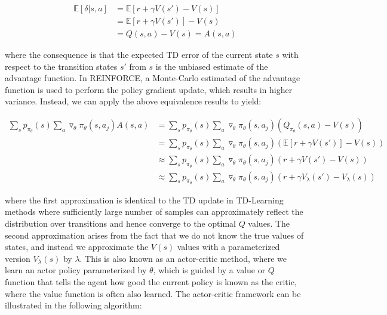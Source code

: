 \documentclass[11pt]{article}
\begin{document}
$$
\begin{aligned}
\mathbb{E}[\delta|s, a] &= \mathbb{E}[r + \gamma V(s') - V(s)]\\
&= \mathbb{E}[r + \gamma V(s')] - V(s)\\
&= Q(s, a) - V(s) = A(s, a)
\end{aligned}
$$

where the consequence is that the expected TD error of the current state $s$ with respect to the transition states $s'$ from $s$ is the unbiased estimate of the advantage function. In REINFORCE, a Monte-Carlo estimated of the advantage function is used to perform the policy gradient update, which results in higher variance. Instead, we can apply the above equivalence results to yield:

$$
\begin{aligned}
\sum_s p_{\pi_{\theta}}(s) \sum_a \triangledown_{\theta} \pi_{\theta}(s, a_j)A(s, a) &= \sum_s p_{\pi_{\theta}}(s) \sum_a \triangledown_{\theta} \pi_{\theta}(s, a_j)(Q_{\pi_{\theta}}(s, a) - V(s))\\
&= \sum_s p_{\pi_{\theta}}(s) \sum_a \triangledown_{\theta} \pi_{\theta}(s, a_j)(\mathbb{E}[r + \gamma V(s')] - V(s))\\
& \approx \sum_s p_{\pi_{\theta}}(s) \sum_a \triangledown_{\theta} \pi_{\theta}(s, a_j)(r + \gamma V(s') - V(s))\\
& \approx \sum_s p_{\pi_{\theta}}(s) \sum_a \triangledown_{\theta} \pi_{\theta}(s, a_j)(r + \gamma V_{\lambda}(s') - V_{\lambda}(s))
\end{aligned}
$$

where the first approximation is identical to the TD update in TD-Learning methods where sufficiently large number of samples can approximately reflect the distribution over transitions and hence converge to the optimal $Q$ values. The second approximation arises from the fact that we do not know the true values of states, and instead we approximate the $V(s)$ values with a parameterized version $V_{\lambda}(s)$ by $\lambda$. This is also known as an actor-critic method, where we learn an actor policy parameterized by $\theta$, which is guided by a value or $Q$ function that tells the agent how good the current policy is known as the critic, where the value function is often also learned. The actor-critic framework can be illustrated in the following algorithm:
\end{document}
